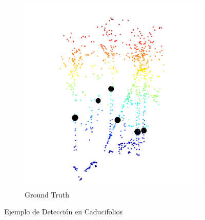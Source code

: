\begin{figure}[h]
  \begin{subfigure}{0.45\textwidth}
    \centering
    \includegraphics[width=0.9\linewidth]{imaxes/grountCad.png}
    \caption{Ground Truth}
    \label{fig:last3}
  \end{subfigure}
  
  \caption{Ejemplo de Detección en Caducifolios}
  \label{fig:algo2}
\end{figure}


